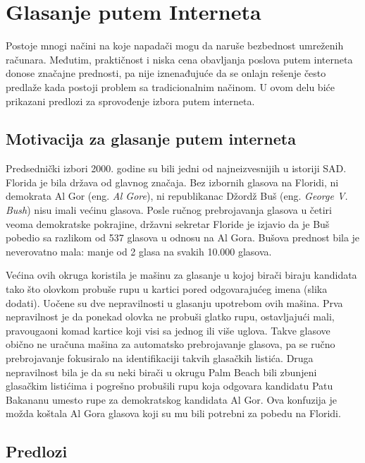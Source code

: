 \documentclass[a4paper]{article}
\begin{document}
{\section{Glasanje putem Interneta}
\label{sec:glasanje}

Postoje mnogi načini na koje napadači mogu da naruše bezbednost umreženih računara. Međutim, praktičnost i niska cena obavljanja poslova putem interneta donose značajne prednosti, pa nije iznenađujuće da se onlajn rešenje često predlaže kada postoji problem sa tradicionalnim načinom. U ovom delu biće prikazani predlozi za sprovođenje izbora putem interneta.

\subsection{Motivacija za glasanje putem interneta}
\label{subsec:Motivacija za glasanje putem interneta}

Predsednički izbori 2000. godine su bili jedni od najneizvesnijih u istoriji SAD. Florida je bila država od glavnog značaja. Bez izbornih glasova na Floridi, ni demokrata Al Gor (eng. {\em Al Gore}), ni republikanac Džordž Buš (eng. {\em George V. Bush}) nisu imali većinu glasova. Posle ručnog prebrojavanja glasova u četiri veoma demokratske pokrajine, državni sekretar Floride je izjavio da je Buš pobedio sa razlikom od 537 glasova u odnosu na Al Gora. Bušova prednost bila je neverovatno mala: manje od 2 glasa na svakih 10.000 glasova.

Većina ovih okruga koristila je mašinu za glasanje u kojoj birači biraju kandidata tako što olovkom probuše rupu u kartici pored odgovarajućeg imena (slika dodati). Uočene su dve nepravilnosti u glasanju upotrebom ovih mašina. Prva nepravilnost je da ponekad olovka ne probuši glatko rupu, ostavljajući mali, pravougaoni komad kartice koji visi sa jednog ili više uglova. Takve glasove obično ne uračuna mašina za automatsko prebrojavanje glasova, pa se ručno prebrojavanje fokusiralo na identifikaciji takvih glasačkih listića. Druga nepravilnost bila je da su neki birači u okrugu Palm Beach bili zbunjeni glasačkim listićima i pogrešno probušili rupu koja odgovara kandidatu Patu Bakananu umesto rupe za demokratskog kandidata Al Gor. Ova konfuzija je možda koštala Al Gora glasova koji su mu bili potrebni za pobedu na Floridi.

\subsection{Predlozi}
\label{subsec:Predlozi}

}
\end{document}
